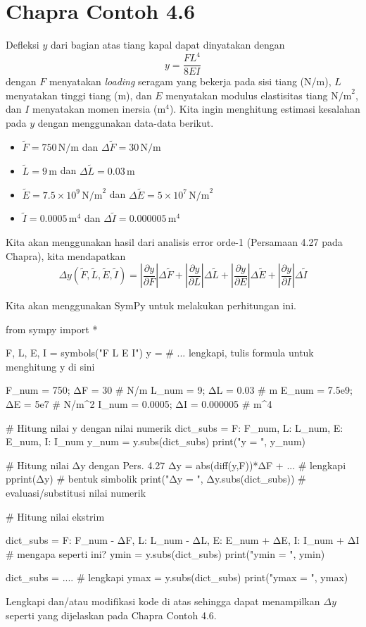 \section{Chapra Contoh 4.6}

Defleksi $y$ dari bagian atas tiang kapal dapat dinyatakan
dengan
\begin{equation}
y = \frac{FL^{4}}{8EI}
\end{equation}
dengan $F$ menyatakan \textit{loading} seragam yang bekerja pada sisi
tiang (N/m), $L$ menyatakan tinggi tiang (m), dan $E$ menyatakan
modulus elastisitas tiang $\textrm{N/m}^{2}$, dan $I$ menyatakan
momen inersia ($\textrm{m}^{4}$). Kita ingin menghitung estimasi kesalahan
pada $y$ dengan menggunakan data-data berikut.
\begin{itemize}
\item $\tilde{F} = 750\,\textrm{N/m}$ dan $\Delta\tilde{F} = 30\,\textrm{N/m}$
\item $\tilde{L} = 9\,\textrm{m}$ dan $\Delta\tilde{L} = 0.03\,\textrm{m}$
\item $\tilde{E} = 7.5\times10^{9}\,\textrm{N/m}^{2}$ dan $\Delta\tilde{E} = 5\times10^{7}\,\textrm{N/m}^{2}$
\item $\tilde{I} = 0.0005\,\textrm{m}^{4}$ dan $\Delta\tilde{I} = 0.000005\,\textrm{m}^{4}$
\end{itemize}

Kita akan menggunakan hasil dari analisis error orde-1 (Persamaan 4.27 pada Chapra), kita
mendapatkan
\begin{equation*}
\Delta y(\tilde{F},\tilde{L},\tilde{E},\tilde{I}) =
\left| \frac{\partial y}{\partial F} \right| \Delta\tilde{F} +
\left| \frac{\partial y}{\partial L} \right| \Delta\tilde{L} +
\left| \frac{\partial y}{\partial E} \right| \Delta\tilde{E} +
\left| \frac{\partial y}{\partial I} \right| \Delta\tilde{I}
\end{equation*}

Kita akan menggunakan SymPy untuk melakukan perhitungan ini.

\begin{pythoncode}
from sympy import *

F, L, E, I = symbols("F L E I")
y = # ... lengkapi, tulis formula untuk menghitung y di sini
    
F_num = 750; ΔF = 30 # N/m
L_num = 9; ΔL = 0.03 # m
E_num = 7.5e9; ΔE = 5e7 # N/m^2
I_num = 0.0005; ΔI = 0.000005 # m^4

# Hitung nilai y dengan nilai numerik
dict_subs = {F: F_num, L: L_num, E: E_num, I: I_num}
y_num = y.subs(dict_subs)
print("y = ", y_num)

# Hitung nilai Δy dengan Pers. 4.27
Δy = abs(diff(y,F))*ΔF + ... # lengkapi
pprint(Δy) # bentuk simbolik
print("Δy = ", Δy.subs(dict_subs)) # evaluasi/substitusi nilai numerik

# Hitung nilai ekstrim

dict_subs = {
  F: F_num - ΔF, L: L_num - ΔL,
  E: E_num + ΔE, I: I_num + ΔI  # mengapa seperti ini?
} 
ymin = y.subs(dict_subs)
print("ymin = ", ymin)
    
dict_subs = .... # lengkapi 
ymax = y.subs(dict_subs)
print("ymax = ", ymax)    
\end{pythoncode}

\begin{soal}
Lengkapi dan/atau modifikasi kode di atas sehingga dapat menampilkan $\Delta y$
seperti yang dijelaskan pada Chapra Contoh 4.6.
\end{soal}